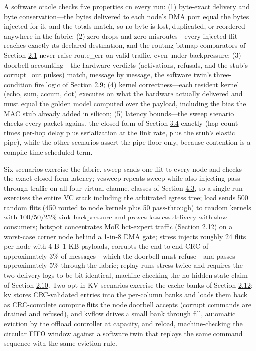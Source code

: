 \documentclass[12pt,onecolumn]{article}
\begin{document}
A software oracle checks five properties on every run: (1) byte-exact delivery and byte conservation---the bytes delivered to each node's DMA port equal the bytes injected for it, and the totals match, so no byte is lost, duplicated, or reordered anywhere in the fabric; (2) zero drops and zero misroutes---every injected flit reaches exactly its declared destination, and the routing-bitmap comparators of Section \hyperref[sec:2.1]{2.1} never raise route\_err on valid traffic, even under backpressure; (3) doorbell accounting---the hardware verdicts (activations, refusals, and the stub's corrupt\_out pulses) match, message by message, the software twin's three-condition fire logic of Section \hyperref[sec:2.9]{2.9}; (4) kernel correctness---each resident kernel (echo, sum, accum, dot) executes on what the hardware actually delivered and must equal the golden model computed over the payload, including the bias the MAC stub already added in silicon; (5) latency bounds---the sweep scenario checks every packet against the closed form of Section \hyperref[sec:3.4]{3.4} exactly (hop count times per-hop delay plus serialization at the link rate, plus the stub's elastic pipe), while the other scenarios assert the pipe floor only, because contention is a compile-time-scheduled term.

Six scenarios exercise the fabric. sweep sends one flit to every node and checks the exact closed-form latency; vcsweep repeats sweep while also injecting pass-through traffic on all four virtual-channel classes of Section \hyperref[sec:4.3]{4.3}, so a single run exercises the entire VC stack including the arbitrated egress tree; load sends 500 random flits (450 routed to node kernels plus 50 pass-through) to random kernels with 100/50/25\% sink backpressure and proves lossless delivery with slow consumers; hotspot concentrates MoE hot-expert traffic (Section \hyperref[sec:2.12]{2.12}) on a worst-case corner node behind a 1-in-8 DMA gate; stress injects roughly 24 flits per node with 4 B--1 KB payloads, corrupts the end-to-end CRC of approximately 3\% of messages---which the doorbell must refuse---and passes approximately 5\% through the fabric; replay runs stress twice and requires the two delivery logs to be bit-identical, machine-checking the no-hidden-state claim of Section \hyperref[sec:2.10]{2.10}. Two opt-in KV scenarios exercise the cache banks of Section \hyperref[sec:2.12]{2.12}: kv stores CRC-validated entries into the per-column banks and loads them back as CRC-complete compute flits the node doorbell accepts (corrupt commands are drained and refused), and kvflow drives a small bank through fill, automatic eviction by the offload controller at capacity, and reload, machine-checking the circular FIFO window against a software twin that replays the same command sequence with the same eviction rule.
\end{document}
